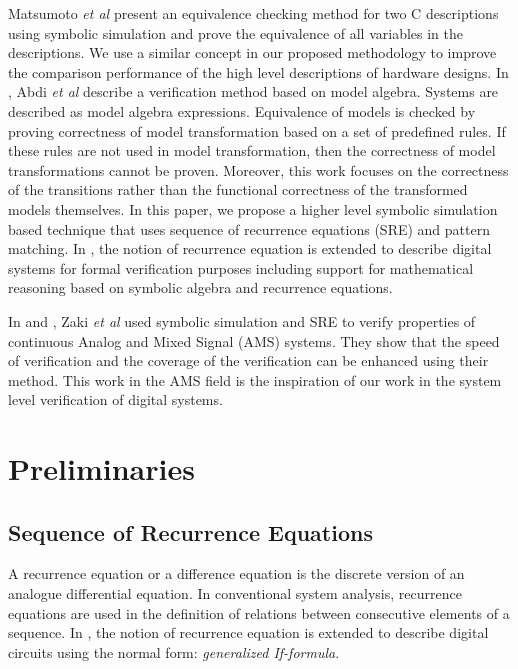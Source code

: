 \documentclass[submission,copyright,creativecommons]{eptcs}
\begin{document}
Matsumoto \emph{et al} \cite{4} present an equivalence checking method for two C descriptions using symbolic simulation and prove the equivalence of all variables in the descriptions. We use a similar concept in our proposed methodology to improve the comparison performance of the high level descriptions of hardware designs. In \cite{22}, Abdi \emph{et al} describe a verification method based on model algebra. Systems are described as model algebra expressions. Equivalence of models is checked by proving correctness of model transformation based on a set of predefined rules. If these rules are not used in model transformation, then the correctness of model transformations cannot be proven. Moreover, this work focuses on the correctness of the transitions rather than the functional correctness of the transformed models themselves. In this paper, we propose a higher level symbolic simulation based technique that uses sequence of recurrence equations (SRE) and pattern matching. In \cite{1}, the notion of recurrence equation is extended to describe digital systems for formal verification purposes including support for mathematical reasoning based on symbolic algebra and recurrence equations.

In \cite{33} and \cite{34}, Zaki \emph{et al} used symbolic simulation and SRE to verify properties of continuous Analog and Mixed Signal (AMS) systems. They show that the speed of verification and the coverage of the verification can be enhanced using their method. This work in the AMS field is the inspiration of our work in the system level verification of digital systems.

\section{Preliminaries}
\subsection{Sequence of Recurrence Equations  }
A recurrence equation or a difference equation is the discrete version of an analogue differential equation. In conventional system analysis, recurrence equations are used in the definition of relations between consecutive elements of a sequence. In \cite{1}, the notion of recurrence equation is extended to describe digital circuits using the normal form: \emph{generalized If-formula}.\\
\end{document}

